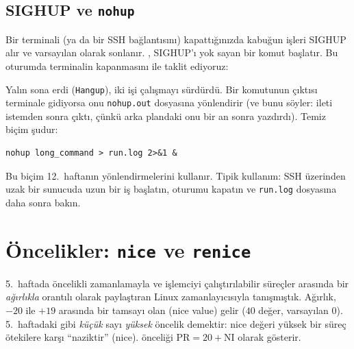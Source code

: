\subsection{SIGHUP ve \texttt{nohup}}
\label{sec:nohup}

Bir terminali (ya da bir SSH bağlantısını) kapattığınızda kabuğun işleri SIGHUP alır ve varsayılan olarak sonlanır. , SIGHUP'ı yok sayan bir komut başlatır. Bu oturumda terminalin kapanmasını  ile taklit ediyoruz:



Yalın  sona erdi (\texttt{Hangup}), iki  işi çalışmayı sürdürdü. Bir  komutunun çıktısı terminale gidiyorsa  onu \texttt{nohup.out} dosyasına yönlendirir (ve bunu söyler: ileti istemden sonra çıktı, çünkü arka plandaki  onu bir an sonra yazdırdı). Temiz biçim şudur:
\begin{lstlisting}[style=term]
nohup long_command > run.log 2>&1 &
\end{lstlisting}
Bu biçim 12.~haftanın yönlendirmelerini kullanır. Tipik kullanım: SSH üzerinden uzak bir sunucuda uzun bir iş başlatın, oturumu kapatın ve \texttt{run.log} dosyasına daha sonra bakın.

\section{Öncelikler: \texttt{nice} ve \texttt{renice}}
\label{sec:nice}

5.~haftada öncelikli zamanlamayla ve işlemciyi çalıştırılabilir süreçler arasında bir \emph{ağırlıkla} orantılı olarak paylaştıran Linux zamanlayıcısıyla tanışmıştık. Ağırlık, $-20$ ile $+19$ arasında bir tamsayı olan  (nice value) gelir ($40$ değer, varsayılan $0$). 5.~haftadaki gibi \emph{küçük} sayı \emph{yüksek} öncelik demektir: nice değeri yüksek bir süreç ötekilere karşı ``naziktir'' (nice).  önceliği $\text{PR} = 20 + \text{NI}$ olarak gösterir.




